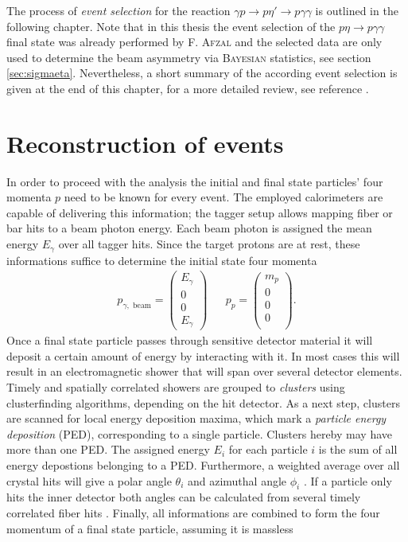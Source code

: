 \noindent The process of \emph{event selection} for the reaction $\gamma p \to p\eta'\to p\gamma\gamma$ is outlined in the following chapter. Note that in this thesis the event selection of the $p\eta\to p\gamma\gamma$ final state was already performed by \textsc{F. Afzal} \cite{farahphd} and the selected data are only used to determine the beam asymmetry via \textsc{Bayesian} statistics, see section \ref{sec:sigmaeta}. Nevertheless, a short summary of the according event selection is given at the end of this chapter, for a more detailed review, see reference \cite{farahphd}.
\section{Reconstruction of events}
In order to proceed with the analysis the initial and final state particles' four momenta $p$ need to be known for every event. The employed calorimeters are capable of delivering this information; the tagger setup allows mapping fiber or bar hits to a beam photon energy. Each beam photon is assigned the mean energy $E_\gamma$ over all tagger hits. Since the target protons are at rest, these informations suffice to determine the initial state four momenta
\begin{align}
	p_{\gamma,\text{ beam}}=\begin{pmatrix}
		E_\gamma\\0\\0\\E_\gamma 
	\end{pmatrix}
&&
 p_p=\begin{pmatrix}
	m_p\\0\\0\\0\\
\end{pmatrix} .
\end{align}
Once a final state particle passes through sensitive detector material it will deposit a certain amount of energy by interacting with it. In most cases this will result in an electromagnetic shower that will span over several detector elements. Timely and spatially correlated showers are grouped to \emph{clusters} using clusterfinding algorithms, depending on the hit detector. As a next step, clusters are scanned for local energy deposition maxima, which mark a \emph{particle energy deposition} (PED), corresponding to a single particle. Clusters hereby may have more than one PED. The assigned energy $E_i$ for each particle $i$ is the sum of all energy depostions belonging to a PED. Furthermore, a weighted average over all crystal hits will give a polar angle $\theta_i$ and azimuthal angle $\phi_i$ \cite{angles1}. If a particle only hits the inner detector both angles can be calculated from several timely correlated fiber hits \cite{angles2}. Finally, all informations are combined to form the four momentum of a final state particle, assuming it is massless
